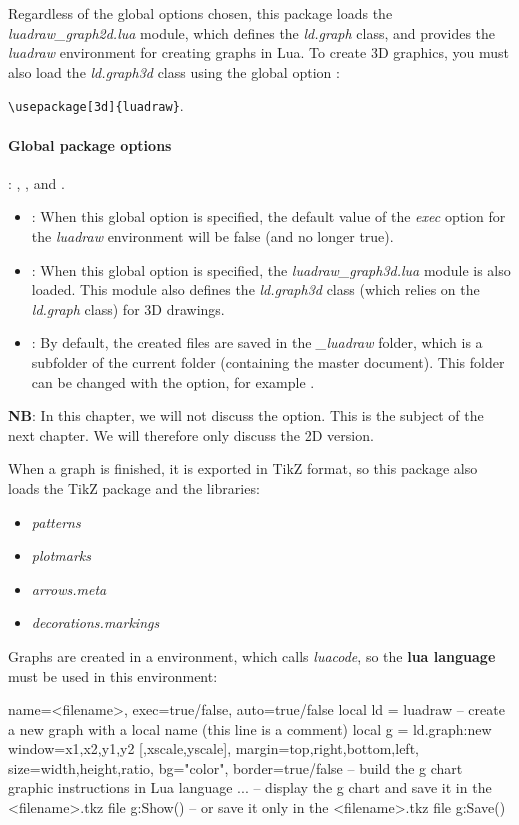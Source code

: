 Regardless of the global options chosen, this package loads the \emph{luadraw\_graph2d.lua} module, which defines the \emph{ld.graph} class, and provides the \emph{luadraw} environment for creating graphs in Lua. To create 3D graphics, you must also load the \emph{ld.graph3d} class using the global option : \par
\hfil\verb|\usepackage[3d]{luadraw}|.\hfil

\paragraph{Global package options}: , , and .

\begin{itemize}
\item {}: When this global option is specified, the default value of the \emph{exec} option for the \emph{luadraw} environment will be false (and no longer true).
\item {}: When this global option is specified, the \emph{luadraw\_graph3d.lua} module is also loaded. This module also defines the \emph{ld.graph3d} class (which relies on the \emph{ld.graph} class) for 3D drawings.
\item {}: By default, the created files are saved in the \emph{\_luadraw} folder, which is a subfolder of the current folder (containing the master document). This folder can be changed with the  option, for example .
\end{itemize}

\noindent\textbf{NB}: In this chapter, we will not discuss the  option. This is the subject of the next chapter. We will therefore only discuss the 2D version.

When a graph is finished, it is exported in TikZ format, so this package also loads the TikZ package and the libraries:
\begin{itemize}
\item\emph{patterns}
\item\emph{plotmarks}
\item\emph{arrows.meta}
\item\emph{decorations.markings}
\end{itemize}

Graphs are created in a \luadrawenv environment, which calls \emph{luacode}, so the \textbf{lua language} must be used in this environment:

\begin{TeXcode}
\begin{luadraw}{ name=<filename>, exec=true/false, auto=true/false }
local ld = luadraw
-- create a new graph with a local name (this line is a comment)
local g = ld.graph:new{ window={x1,x2,y1,y2 [,xscale,yscale]}, margin={top,right,bottom,left},
size={width,height,ratio}, bg="color", border=true/false }
-- build the g chart
graphic instructions in Lua language ...
-- display the g chart and save it in the <filename>.tkz file
g:Show()
-- or save it only in the <filename>.tkz file
g:Save()
\end{luadraw}
\end{TeXcode}

